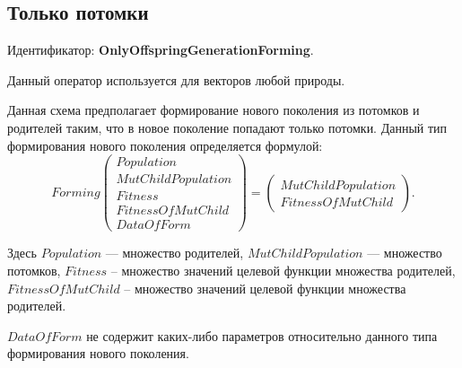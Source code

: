 \subsection{Только потомки}\label{SetOfOperatorsAlgorithms:OnlyOffspringGenerationForming}

Идентификатор: \textbf{OnlyOffspringGenerationForming}.

Данный оператор используется для векторов любой природы.

Данная схема предполагает формирование нового поколения из потомков и родителей таким, что в новое поколение попадают только потомки. Данный тип формирования нового поколения определяется формулой:
\begin{equation}
\label{SetOfOperatorsAlgorithms:eq:OnlyOffspringGenerationForming}
Forming \left( \begin{array}{c} Population\\MutChildPopulation\\Fitness\\FitnessOfMutChild\\DataOfForm\end{array}\right) =\left( \begin{array}{c} MutChildPopulation\\FitnessOfMutChild\end{array}\right).
\end{equation}

Здесь $ Population $ --- множество родителей, $MutChildPopulation$ --- множество потомков, $ Fitness $ -- множество значений целевой функции множества родителей, $ FitnessOfMutChild $ -- множество значений целевой функции множества родителей. 

$ DataOfForm $ не содержит каких-либо параметров относительно данного типа формирования нового поколения.